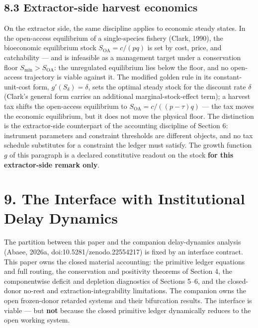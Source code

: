 \documentclass[11pt]{article}
\begin{document}
\subsection*{8.3 Extractor-side harvest economics}\label{83-extractor-side-harvest-economics}

On the extractor side, the same discipline applies to economic steady states. In the open-access equilibrium of a single-species fishery (Clark, 1990), the bioeconomic equilibrium stock \(S_{\mathrm{OA}} = c/(pq)\) is set by cost, price, and catchability --- and is infeasible as a management target under a conservation floor \(S_{\min} > S_{\mathrm{OA}}\): the unregulated equilibrium lies below the floor, and no open-access trajectory is viable against it. The modified golden rule in its constant-unit-cost form, \(g'(S_\delta) = \delta\), sets the optimal steady stock for the discount rate \(\delta\) (Clark's general form carries an additional marginal-stock-effect term); a harvest tax shifts the open-access equilibrium to \(S_{\mathrm{OA}} =\allowbreak{} c/((p - \tau)q)\) --- the tax moves the economic equilibrium, but it does not move the physical floor. The distinction is the extractor-side counterpart of the accounting discipline of Section 6: instrument parameters and constraint thresholds are different objects, and no tax schedule substitutes for a constraint the ledger must satisfy. The growth function \(g\) of this paragraph is a declared constitutive readout on the stock \textbf{for this extractor-side remark only}.

\vspace{0.8em}

\section*{9. The Interface with Institutional Delay Dynamics}\label{9-the-interface-with-institutional-delay-dynamics}

The partition between this paper and the companion delay-dynamics analysis (Abaee, 2026a, doi:10.5281/\allowbreak{}zenodo.22554217) is fixed by an interface contract. This paper owns the closed material accounting: the primitive ledger equations and full routing, the conservation and positivity theorems of Section 4, the componentwise deficit and depletion diagnostics of Sections 5--6, and the closed-donor no-rest and extraction-integrability limitations. The companion owns the open frozen-donor retarded systems and their bifurcation results. The interface is viable --- but \textbf{not} because the closed primitive ledger dynamically reduces to the open working system.
\end{document}

